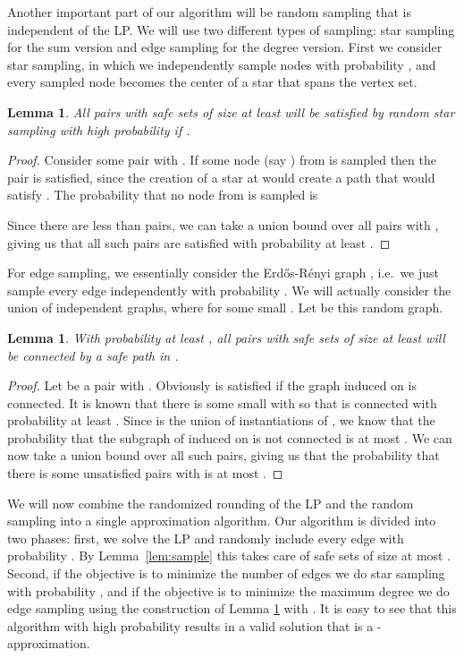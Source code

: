 \documentclass[11pt,letterpaper]{article}
\newtheorem{lemma}[theorem]{Lemma}
\theoremstyle{definition}
\begin{document}
Another important part of our algorithm will be random sampling that is independent of the LP.  We
will use two different types of sampling: star sampling for the sum version and edge sampling for the degree version.  First we
consider star sampling, in which we independently sample nodes with
probability , and every sampled node becomes the center of a star that spans the vertex set.

\begin{lemma} \label{lem:star_sample}
  All pairs with safe sets of size at least  will be satisfied by
  random star sampling with high probability if .
\end{lemma}
\begin{proof}
  Consider some pair  with .  If some node
  (say ) from  is sampled then the pair is satisfied, since
  the creation of a star at  would create a path  that would
  satisfy .  The probability that no node from  is
  sampled is
  
  Since there are less than  pairs, we can take a union bound
  over all pairs  with , giving us that all
  such pairs are satisfied with probability at least .
\end{proof}

For edge sampling, we essentially consider the Erd\H{o}s-R\'{e}nyi
graph , i.e.\ we just sample every edge independently with
probability .  We will actually consider the union of 
independent  graphs, where 
for some small .  Let  be this random graph.

\begin{lemma} \label{lem:edge_sample} With probability at least
  , all pairs with safe sets of size at least  will be
  connected by a safe path in .
\end{lemma}
\begin{proof}
  Let  be a pair with .  Obviously  is
  satisfied if the graph induced on  is connected.  It is
  known \cite{bollobas:01} that there is some small  with  so that  is connected with probability at
  least .  Since  is the union of  instantiations of
  , we know that the probability that the subgraph of 
  induced on  is not connected is at most .  We can now
  take a union bound over all such  pairs, giving us that the
  probability that there is some unsatisfied  pairs with
   is at most .
\end{proof}


We will now combine the randomized rounding of the LP and the random sampling into a single approximation algorithm.  Our algorithm is
divided into two phases: first, we solve the LP and randomly include every edge  with probability .  By Lemma~\ref{lem:sample} this takes care of safe sets of size at most .  Second, if the objective is to
minimize the number of edges we do star sampling with probability
, and if the objective is to minimize the maximum
degree we do edge sampling using the construction of Lemma
\ref{lem:edge_sample} with .  It is easy to see that this algorithm with high probability results in a valid solution that is a -approximation.
\end{document}
